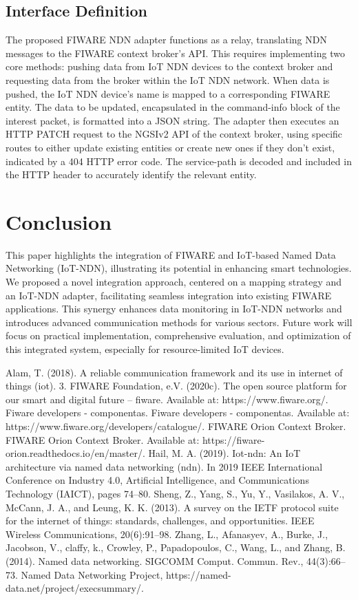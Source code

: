 \documentclass[conference]{IEEEtran}
\begin{document}
\subsection{Interface Definition}
The proposed FIWARE NDN adapter functions as a relay, translating NDN messages to the FIWARE context broker's API.
This requires implementing two core methods: pushing data from IoT NDN devices to the context broker and requesting data from the broker within the IoT NDN network.
When data is pushed, the IoT NDN device's name is mapped to a corresponding FIWARE entity.
The data to be updated, encapsulated in the command-info block of the interest packet, is formatted into a JSON string.
The adapter then executes an HTTP PATCH request to the NGSIv2 API of the context broker, using specific routes to either update existing entities or create new ones if they don't exist, indicated by a 404 HTTP error code.
The service-path is decoded and included in the HTTP header to accurately identify the relevant entity.

\section{Conclusion}
This paper highlights the integration of FIWARE and IoT-based Named Data Networking (IoT-NDN), illustrating its potential in enhancing smart technologies.
We proposed a novel integration approach, centered on a mapping strategy and an IoT-NDN adapter, facilitating seamless integration into existing FIWARE applications.
This synergy enhances data monitoring in IoT-NDN networks and introduces advanced communication methods for various sectors.
Future work will focus on practical implementation, comprehensive evaluation, and optimization of this integrated system, especially for resource-limited IoT devices.

\begin{thebibliography}{00}
     Alam, T. (2018). A reliable communication framework and its use in internet of things (iot). 3.
     FIWARE Foundation, e.V. (2020c). The open source platform for our smart and digital future – fiware. Available at: https://www.fiware.org/.
     Fiware developers - componentas. Fiware developers - componentas. Available at: https://www.fiware.org/developers/catalogue/.
     FIWARE Orion Context Broker. FIWARE Orion Context Broker. Available at: https://fiware-orion.readthedocs.io/en/master/.
     Hail, M. A. (2019). Iot-ndn: An IoT architecture via named data networking (ndn). In 2019 IEEE International Conference on Industry 4.0, Artificial Intelligence, and Communications Technology (IAICT), pages 74–80.
     Sheng, Z., Yang, S., Yu, Y., Vasilakos, A. V., McCann, J. A., and Leung, K. K. (2013). A survey on the IETF protocol suite for the internet of things: standards, challenges, and opportunities. IEEE Wireless Communications, 20(6):91–98.
     Zhang, L., Afanasyev, A., Burke, J., Jacobson, V., claffy, k., Crowley, P., Papadopoulos, C., Wang, L., and Zhang, B. (2014). Named data networking. SIGCOMM Comput. Commun. Rev., 44(3):66–73.
     Named Data Networking Project, https://named-data.net/project/execsummary/.
\end{thebibliography}
\end{document}
